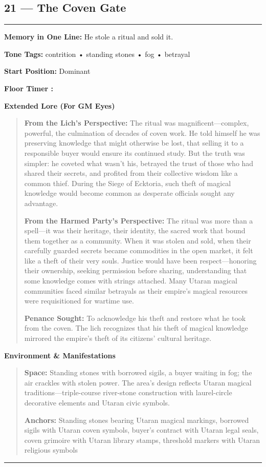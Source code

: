 \documentclass[18pt, letterpaper, twoside]{article}
\newenvironment{floorbox}[1]{%
    \begin{center}
    \begin{minipage}{0.95\textwidth}
    \subsection*{#1}
    \vspace{-0.5em}
    \rule{\textwidth}{0.5pt}
    \vspace{0.5em}
}{%
    \vspace{0.5em}
    \rule{\textwidth}{0.5pt}
    \end{minipage}
    \end{center}
}
\newenvironment{gmnote}[1]{%
    \vspace{0.5em}
    \noindent\textbf{#1}
    \begin{quote}
}{%
    \end{quote}
    \vspace{0.5em}
}
\newcommand{\memoryline}[1]{\noindent\textbf{Memory in One Line:} #1\par}
\newcommand{\tonetags}[1]{\noindent\textbf{Tone Tags:} #1\par}
\newcommand{\startposition}[1]{\noindent\textbf{Start Position:} #1\par}
\newcommand{\floortimer}[1]{\noindent\textbf{Floor Timer :} \fbox{#1}\par}
\begin{document}
\begin{floorbox}{21 --- The Coven Gate}
\memoryline{He stole a ritual and sold it.}
\tonetags{contrition • standing stones • fog • betrayal}
\startposition{Dominant}
\floortimer{[5] --- Buyer names an ally; stone groans; threshold tears.}

\begin{gmnote}{Extended Lore (For GM Eyes)}
\textbf{From the Lich's Perspective:} The ritual was magnificent---complex, powerful, the culmination of decades of coven work. He told himself he was preserving knowledge that might otherwise be lost, that selling it to a responsible buyer would ensure its continued study. But the truth was simpler: he coveted what wasn't his, betrayed the trust of those who had shared their secrets, and profited from their collective wisdom like a common thief. During the Siege of Ecktoria, such theft of magical knowledge would become common as desperate officials sought any advantage.

\textbf{From the Harmed Party's Perspective:} The ritual was more than a spell---it was their heritage, their identity, the sacred work that bound them together as a community. When it was stolen and sold, when their carefully guarded secrets became commodities in the open market, it felt like a theft of their very souls. Justice would have been respect---honoring their ownership, seeking permission before sharing, understanding that some knowledge comes with strings attached. Many Utaran magical communities faced similar betrayals as their empire's magical resources were requisitioned for wartime use.

\textbf{Penance Sought:} To acknowledge his theft and restore what he took from the coven. The lich recognizes that his theft of magical knowledge mirrored the empire's theft of its citizens' cultural heritage.
\end{gmnote}

\begin{gmnote}{Environment \& Manifestations}
\textbf{Space:} Standing stones with borrowed sigils, a buyer waiting in fog; the air crackles with stolen power. The area's design reflects Utaran magical traditions---triple-course river-stone construction with laurel-circle decorative elements and Utaran civic symbols.

\textbf{Anchors:} Standing stones bearing Utaran magical markings, borrowed sigils with Utaran coven symbols, buyer's contract with Utaran legal seals, coven grimoire with Utaran library stamps, threshold markers with Utaran religious symbols


\end{gmnote}
\end{floorbox}
\end{document}
